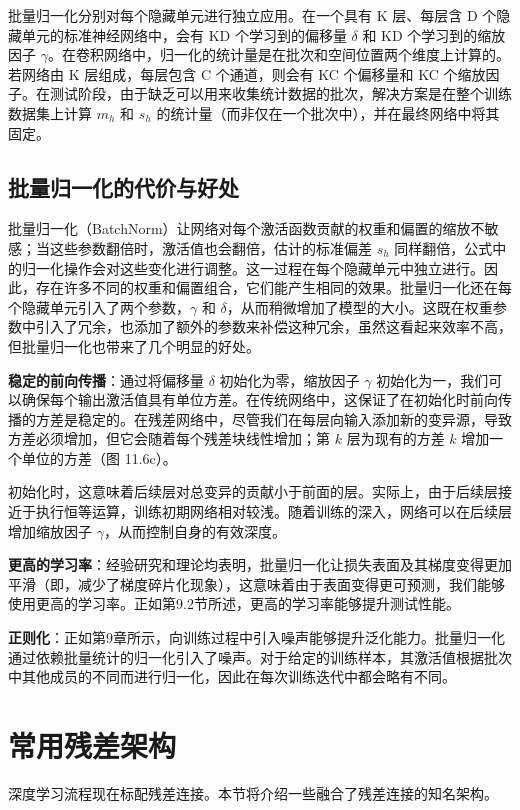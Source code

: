 批量归一化分别对每个隐藏单元进行独立应用。在一个具有 K 层、每层含 D 个隐藏单元的标准神经网络中，会有 KD 个学习到的偏移量 \(\delta\) 和 KD 个学习到的缩放因子 \(\gamma\)。在卷积网络中，归一化的统计量是在批次和空间位置两个维度上计算的。若网络由 K 层组成，每层包含 C 个通道，则会有 KC 个偏移量和 KC 个缩放因子。在测试阶段，由于缺乏可以用来收集统计数据的批次，解决方案是在整个训练数据集上计算 \(m_h\) 和 \(s_h\) 的统计量（而非仅在一个批次中），并在最终网络中将其固定。

\subsection{批量归一化的代价与好处}
批量归一化（BatchNorm）让网络对每个激活函数贡献的权重和偏置的缩放不敏感；当这些参数翻倍时，激活值也会翻倍，估计的标准偏差 \(s_h\) 同样翻倍，公式中的归一化操作会对这些变化进行调整。这一过程在每个隐藏单元中独立进行。因此，存在许多不同的权重和偏置组合，它们能产生相同的效果。批量归一化还在每个隐藏单元引入了两个参数，\(\gamma\) 和 \(\delta\)，从而稍微增加了模型的大小。这既在权重参数中引入了冗余，也添加了额外的参数来补偿这种冗余，虽然这看起来效率不高，但批量归一化也带来了几个明显的好处。

\textbf{稳定的前向传播}：通过将偏移量 \(\delta\) 初始化为零，缩放因子 \(\gamma\) 初始化为一，我们可以确保每个输出激活值具有单位方差。在传统网络中，这保证了在初始化时前向传播的方差是稳定的。在残差网络中，尽管我们在每层向输入添加新的变异源，导致方差必须增加，但它会随着每个残差块线性增加；第 \(k\) 层为现有的方差 \(k\) 增加一个单位的方差（图 11.6c）。

初始化时，这意味着后续层对总变异的贡献小于前面的层。实际上，由于后续层接近于执行恒等运算，训练初期网络相对较浅。随着训练的深入，网络可以在后续层增加缩放因子 \(\gamma\)，从而控制自身的有效深度。

\textbf{更高的学习率}：经验研究和理论均表明，批量归一化让损失表面及其梯度变得更加平滑（即，减少了梯度碎片化现象），这意味着由于表面变得更可预测，我们能够使用更高的学习率。正如第9.2节所述，更高的学习率能够提升测试性能。

\textbf{正则化}：正如第9章所示，向训练过程中引入噪声能够提升泛化能力。批量归一化通过依赖批量统计的归一化引入了噪声。对于给定的训练样本，其激活值根据批次中其他成员的不同而进行归一化，因此在每次训练迭代中都会略有不同。

\section{常用残差架构}
深度学习流程现在标配残差连接。本节将介绍一些融合了残差连接的知名架构。

